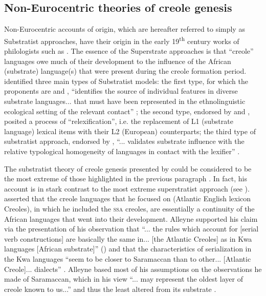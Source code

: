 \subsection {Non-Eurocentric theories of creole genesis} \label{2.2.2}
Non-Eurocentric accounts of origin, which are hereafter referred to simply as Substratist approaches, have their origin in the early 19\textsuperscript{th} century works of philologists such as  \citet{Baissac80}. The essence of the Superstrate approaches is that ``creole'' languages owe much of their development to the influence of the African (substrate) language(s) that were present during the creole formation period. \citet{Mufwene90, Mufwene96b} identified three main types of Substratist models: the first type, for which the proponents are  \citet{Alleyne80, Alleyne96} and  \citet{Holm89}, ``identifies the source of individual features in diverse substrate languages... that must have been represented in the ethnolinguistic ecological setting of the relevant contact'' \citep[167]{Mufwene96b}; the second type, endorsed by  \citet{Lefebvre98, Lefebvre04} and  \citet{Lumsden99}, posited a process of ``relexification'', i.e. the replacement of L1 (substrate language) lexical items with their L2 (European) counterparts; the third type of substratist approach, endorsed by  \citet{Keesing88}, ``... validates substrate influence with the relative typological homogeneity of languages in contact with the lexifier'' \citep[167]{Mufwene96b}.

The substratist theory of creole genesis presented by \citet{Alleyne80} could be considered to be the most extreme of those highlighted in the previous paragraph \citep{Byrne87}. In fact, his account is in stark contrast to the most extreme superstratist approach (see ).  \citet{Alleyne80} asserted that the creole languages that he focused on (Atlantic English lexicon Creoles), in which he included the \textsc{ssa} creoles, are essentially a continuity of the African languages that went into their development. Alleyne supported his claim via the presentation of his observation that ``... the rules which account for [serial verb constructions] are basically the same in... [the Atlantic Creoles] as in Kwa languages [African substrate]'' (\citeyear[167]{Alleyne80}) and that the characteristics of serialization in the Kwa languages ``seem to be closer to Saramaccan than to other... [Atlantic Creole]... dialects'' \citep[167]{Alleyne80}. Alleyne based most of his assumptions on the observations he made of Saramaccan, which in his view ``... may represent the oldest layer of creole known to us...'' and thus the least altered from its substrate \citep[91]{Alleyne79}.

